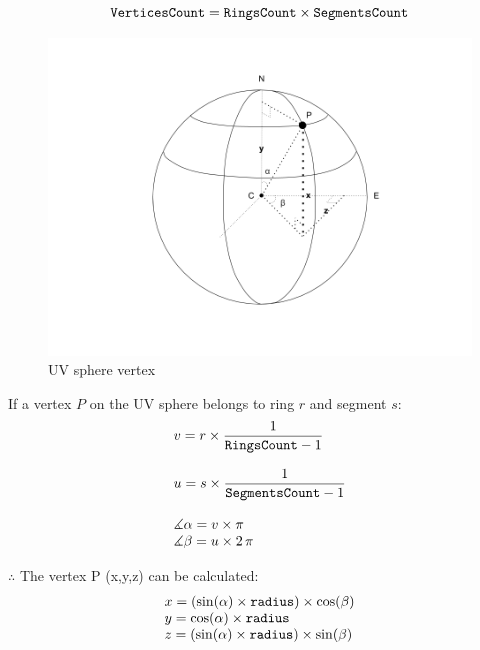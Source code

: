 \begin{equation}
\label{equ:uv-sphere-vertices}
\texttt{VerticesCount} = \texttt{RingsCount} \times \texttt{SegmentsCount}
\end{equation}

\begin{figure}[H]
\caption{UV sphere vertex}
\label{fig:uv-sphere-vertex}
\centering
\includegraphics[width=\textwidth, keepaspectratio]{Figures/uv-sphere-vertex.png}
\decoRule
\end{figure}

If a vertex $P$ on the UV sphere belongs to ring $r$ and segment $s$:
\[
\begin{array}{lr}
v = r \times \dfrac{1}{\texttt{RingsCount} - 1}\\\\
u = s \times \dfrac{1}{\texttt{SegmentsCount} - 1}\\\\
\measuredangle \alpha = v \times \pi\\
\measuredangle \beta = u \times 2\,\pi\\
\end{array}
\]

$\therefore$ The vertex P (x,\;y,\;z) can be calculated:
\[
\begin{array}{lr}
x = (\sin(\alpha) \times \texttt{radius}) \times \cos(\beta)\\
y = \cos(\alpha) \times \texttt{radius}\\
z = (\sin(\alpha) \times \texttt{radius}) \times \sin(\beta)\\
\end{array}
\]

